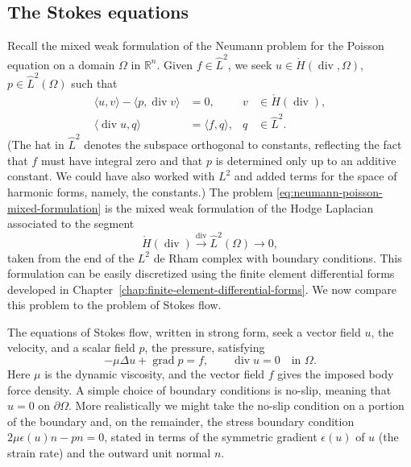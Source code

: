 \subsection{{The Stokes equations}}\label{sec:stokes-equations}

{Recall the mixed weak formulation of the Neumann problem for the Poisson equation on a domain $\Omega$ in $\mathbb R^n$. Given $f\in\hat L^2$, we seek $u\in\mathring H(\operatorname{div},\Omega)$, $p\in\hat L^2(\Omega)$ such that}
\begin{equation}\label{eq:neumann-poisson-mixed-formulation}
\begin{aligned}\langle u,v\rangle-\langle p,\operatorname{div}v\rangle&=0,&v&\in\mathring H(\operatorname{div}),\\\langle\operatorname{div}u,q\rangle&=\langle f,q\rangle,&q&\in\hat L^2.\end{aligned}
\end{equation}
{(The hat in $\hat L^2$ denotes the subspace orthogonal to constants, reflecting the fact that $f$ must have integral zero and that $p$ is determined only up to an additive constant. We could have also worked with $L^2$ and added terms for the space of harmonic forms, namely, the constants.) The problem \eqref{eq:neumann-poisson-mixed-formulation} is the mixed weak formulation of the Hodge Laplacian associated to the segment}
\begin{equation}\label{eq:neumann-divergence-complex}
\mathring H(\operatorname{div})\xrightarrow{\operatorname{div}}\hat L^2(\Omega)\to0,
\end{equation}
{taken from the end of the $L^2$ de Rham complex with boundary conditions. This formulation can be easily discretized using the finite element differential forms developed in Chapter~\ref{chap:finite-element-differential-forms}. We now compare this problem to the problem of Stokes flow.}

{The equations of Stokes flow, written in strong form, seek a vector field $u$, the velocity, and a scalar field $p$, the pressure, satisfying}
\[
-\mu\Delta u+\operatorname{grad}p=f,\qquad\operatorname{div}u=0\quad\text{in }\Omega.
\]
{Here $\mu$ is the dynamic viscosity, and the vector field $f$ gives the imposed body force density. A simple choice of boundary conditions is no-slip, meaning that $u=0$ on $\partial\Omega$. More realistically we might take the no-slip condition on a portion of the boundary and, on the remainder, the stress boundary condition $2\mu\epsilon(u)n-pn=0$, stated in terms of the symmetric gradient $\epsilon(u)$ of $u$ (the strain rate) and the outward unit normal $n$.}

